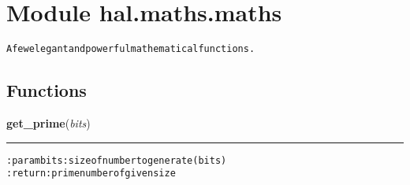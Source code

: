 %
%
%


\section{Module hal.maths.maths}

    \label{hal:maths:maths}
\begin{alltt}
A few elegant and powerful mathematical functions. 
\end{alltt}



  \subsection{Functions}

    \label{hal:maths:maths:get_prime}

    \vspace{0.5ex}

\hspace{.8\funcindent}\begin{boxedminipage}{\funcwidth}

    \raggedright \textbf{get\_prime}(\textit{bits})

    \vspace{-1.5ex}

    \rule{\textwidth}{0.5\fboxrule}
\setlength{\parskip}{2ex}
\begin{alltt}

:param bits: size of number to generate (bits)
:return: prime number of given size
\end{alltt}

\setlength{\parskip}{1ex}
    \end{boxedminipage}

